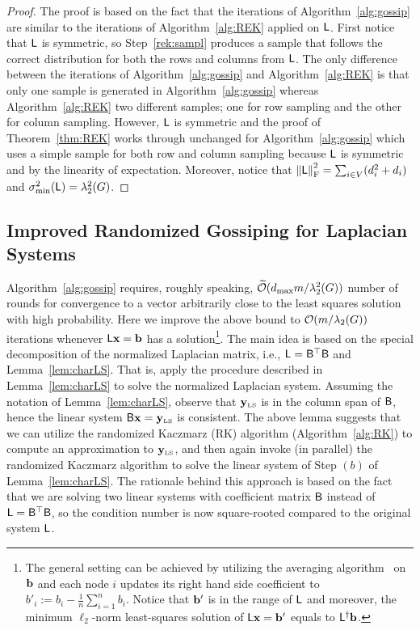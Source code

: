 %
%
\begin{proof}
The proof is based on the fact that the iterations of Algorithm~\ref{alg:gossip} are similar to the iterations of Algorithm~\ref{alg:REK} applied on ${\mathsf{L} }$. First notice that ${\mathsf{L} }$ is symmetric, so Step~\ref{rek:sampl} produces a sample that follows the correct distribution for both the rows and columns from ${\mathsf{L} }$. The only difference between the iterations of Algorithm~\ref{alg:gossip} and Algorithm~\ref{alg:REK} is that only one sample is generated in Algorithm~\ref{alg:gossip} whereas Algorithm~\ref{alg:REK} two different samples; one for row sampling and the other for column sampling. However, ${\mathsf{L} }$ is symmetric and the proof of Theorem~\ref{thm:REK} works through unchanged for Algorithm~\ref{alg:gossip} which uses a simple sample for both row and column sampling because ${\mathsf{L} }$ is symmetric and by the linearity of expectation. Moreover, notice that $\left\|{\mathsf{L} }\right\|_{\textrm{F}}^2 = \sum_{i\in V} (d_i^2 + d_i)$ and $\sigma^2_{\min}({\mathsf{L} }) = \lambda_2^2(G)$.
\end{proof}

\subsection{Improved Randomized Gossiping for Laplacian Systems}\label{sec:improvedGossip}
Algorithm~\ref{alg:gossip} requires, roughly speaking, $\widetilde{\mathcal{O}}( d_{\max} m / \lambda_2^2(G))$ number of rounds for convergence to a vector arbitrarily close to the least squares solution with high probability. Here we improve the above bound to $\mathcal{O}( m / \lambda_2(G))$ iterations whenever ${\mathsf{L} } \mathbf{x} = {\mathbf b}$ has a solution\footnote{The general setting can be achieved by utilizing the averaging algorithm~\cite{gossip:Boyd} on ${\mathbf b}$ and each node $i$ updates its right hand side coefficient to $b'_i:=b_i - \frac1{n}\sum_{i=1}^n{b_i}$. Notice that ${\mathbf b}'$ is in the range of ${\mathsf{L} }$ and moreover, the minimum $\ell_2$-norm least-squares solution of ${\mathsf{L} } \mathbf{x} = {\mathbf b}'$ equals to ${{\mathsf{L} }}^\dagger {\mathbf b}$.}. The main idea is based on the special decomposition of the normalized Laplacian matrix, i.e., ${\mathsf{L} }= {\mathsf{B} }^\top{\ensuremath{\mathsf{B} }} $ and Lemma~\ref{lem:charLS}. That is, apply the procedure described in Lemma~\ref{lem:charLS} to solve the normalized Laplacian system. Assuming the notation of Lemma~\ref{lem:charLS}, observe that $\mathbf{y}_{\textrm{\tiny LS}}$ is in the column span of ${\mathsf{B} }$, hence the linear system ${\mathsf{B} } \mathbf{x} = \mathbf{y}_{\textrm{\tiny LS}}$ is consistent. The above lemma suggests that we can utilize the randomized Kaczmarz (RK) algorithm (Algorithm~\ref{alg:RK}) to compute an approximation to $\mathbf{y}_{\textrm{\tiny LS}}$, and then again invoke (in parallel) the randomized Kaczmarz algorithm to solve the linear system of Step $(b)$ of Lemma~\ref{lem:charLS}. The rationale behind this approach is based on the fact that we are solving two linear systems with coefficient matrix ${\mathsf{B} }$ instead of ${\mathsf{L} }={\mathsf{B} }^\top {\ensuremath{\mathsf{B} }}$, so the condition number is now square-rooted compared to the original system ${\mathsf{L} }$.

